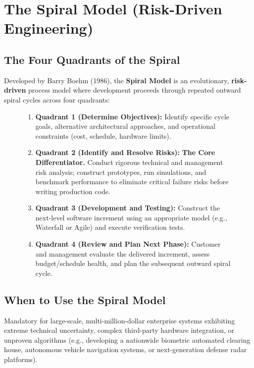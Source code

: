 \section{The Spiral Model (Risk-Driven Engineering)}
\label{sec:se_spiral_model}

\subsection{The Four Quadrants of the Spiral}
Developed by Barry Boehm (1986), the \textbf{Spiral Model} is an evolutionary, \textbf{risk-driven} process model where development proceeds through repeated outward spiral cycles across four quadrants:
\begin{figure}[htbp]
\centering
\begin{tcolorbox}[colback=codebg, colframe=primary, title=\textbf{The Four Operational Quadrants of the Spiral Model}]
\begin{enumerate}
    \item \textbf{Quadrant 1 (Determine Objectives):} Identify specific cycle goals, alternative architectural approaches, and operational constraints (cost, schedule, hardware limits).
    \item \textbf{Quadrant 2 (Identify and Resolve Risks):} \textbf{The Core Differentiator.} Conduct rigorous technical and management risk analysis; construct prototypes, run simulations, and benchmark performance to eliminate critical failure risks before writing production code.
    \item \textbf{Quadrant 3 (Development and Testing):} Construct the next-level software increment using an appropriate model (e.g., Waterfall or Agile) and execute verification tests.
    \item \textbf{Quadrant 4 (Review and Plan Next Phase):} Customer and management evaluate the delivered increment, assess budget/schedule health, and plan the subsequent outward spiral cycle.
\end{enumerate}
\end{tcolorbox}
\end{figure}

\subsection{When to Use the Spiral Model}
Mandatory for large-scale, multi-million-dollar enterprise systems exhibiting extreme technical uncertainty, complex third-party hardware integration, or unproven algorithms (e.g., developing a nationwide biometric automated clearing house, autonomous vehicle navigation systems, or next-generation defense radar platforms).

